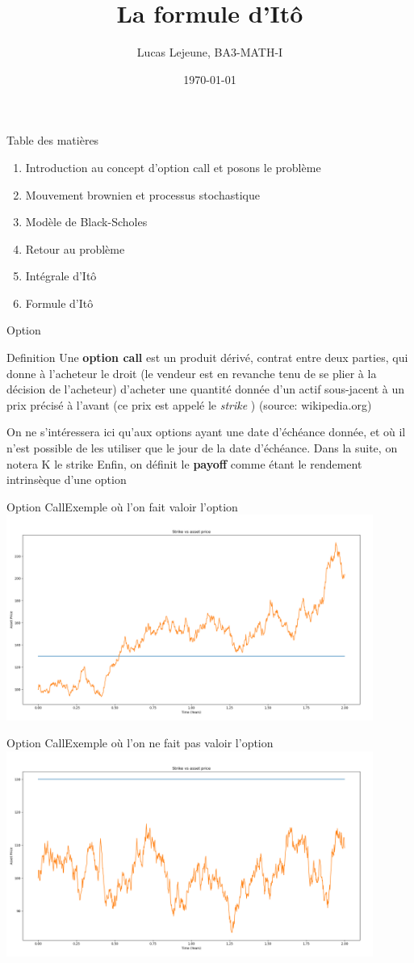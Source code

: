 \documentclass{beamer}
\title{La formule d'Itô}
\date{\today}
\author{Lucas Lejeune, BA3-MATH-I}
\newcommand{\1}{\mathmybb{1}}
\begin{document}
\frame{\titlepage}

\begin{frame}{Table des matières}
  \begin{enumerate}
    \item Introduction au concept d'option call et posons le problème
    \item Mouvement brownien et processus stochastique
    \item Modèle de Black-Scholes
    \item Retour au problème
    \item Intégrale d'Itô
    \item Formule d'Itô
  \end{enumerate}
\end{frame}
\begin{frame}{Option}
  \begin{block}{Definition}
    Une \textbf{option call} est un produit dérivé, contrat entre deux parties, qui donne à l'acheteur le droit (le vendeur est en revanche tenu de se plier à la décision de l'acheteur) d'acheter une quantité donnée d'un actif sous-jacent à un prix précisé à l'avant (ce prix est appelé le {\em strike} ) (source: wikipedia.org)
  \end{block}
  \pause
  On ne s'intéressera ici qu'aux options ayant une date d'échéance donnée, et où il n'est possible de les utiliser que le jour de la date d'échéance.
  Dans la suite, on notera K le strike
  Enfin, on définit le \textbf{payoff} comme étant le rendement intrinsèque d'une option
\end{frame}
\begin{frame}{Option Call}{Exemple où l'on fait valoir l'option}
  \includegraphics[width=12cm]{imgs/strike.png}
\end{frame}
\begin{frame}{Option Call}{Exemple où l'on ne fait pas valoir l'option}
  \includegraphics[width=12cm]{imgs/nostrike.png}
  \end{frame}
\end{document}
